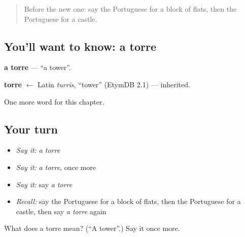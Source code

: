 \label{lesson:PT-C163-torre}



\begin{quote}
Before the new one: say the Portuguese for a block of flats, then the Portuguese for a castle.
\end{quote}

\subsection*{You'll want to know: a torre}
\textbf{a torre} — \textquotedblleft{}a tower\textquotedblright{}.

\begin{cousinweb}
\textbf{torre} $\leftarrow$ Latin \emph{turris}, \textquotedblleft{}tower\textquotedblright{} (EtymDB 2.1) — inherited.
\end{cousinweb}

\begin{grammarlens}[title={What you've built}]
One more word for this chapter.
\end{grammarlens}

\subsection*{Your turn}
\begin{itemize}
\raggedright
  \item \emph{Say it:} \emph{a torre}
  \item \emph{Say it:} \emph{a torre}, once more
  \item \emph{Say it:} say \emph{a torre}
  \item \emph{Recall:} say the Portuguese for a block of flats, then the Portuguese for a castle, then say \emph{a torre} again
\end{itemize}

\begin{tcolorbox}[breakable,colback=teal!4,colframe=teal!35!black,title={Before you move on}]
What does a torre mean? (\textquotedblleft{}A tower\textquotedblright{}.) Say it once more.
\end{tcolorbox}
